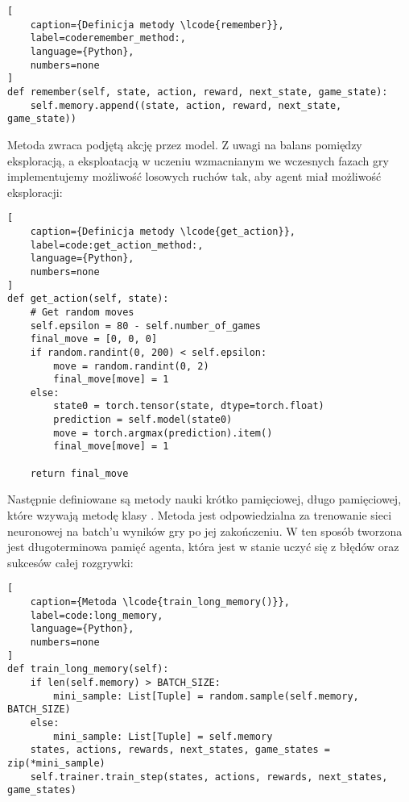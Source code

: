 \begin{onepage}
    \begin{lstlisting}[
    caption={Definicja metody \lcode{remember}},
    label=coderemember_method:,
    language={Python},
    numbers=none
]
def remember(self, state, action, reward, next_state, game_state):
    self.memory.append((state, action, reward, next_state, game_state))
    \end{lstlisting}
\end{onepage}

Metoda  zwraca podjętą akcję przez model. Z uwagi na balans pomiędzy eksploracją, a eksploatacją w uczeniu wzmacnianym we wczesnych fazach gry implementujemy możliwość losowych ruchów tak, aby agent miał możliwość eksploracji:

\begin{onepage}
    \begin{lstlisting}[
    caption={Definicja metody \lcode{get_action}},
    label=code:get_action_method:,
    language={Python},
    numbers=none
]
def get_action(self, state):
    # Get random moves
    self.epsilon = 80 - self.number_of_games
    final_move = [0, 0, 0]
    if random.randint(0, 200) < self.epsilon:
        move = random.randint(0, 2)
        final_move[move] = 1
    else:
        state0 = torch.tensor(state, dtype=torch.float)
        prediction = self.model(state0)
        move = torch.argmax(prediction).item()
        final_move[move] = 1

    return final_move
\end{lstlisting}
\end{onepage}



Następnie definiowane są metody nauki krótko pamięciowej, długo pamięciowej, które wzywają metodę  klasy .
Metoda  jest odpowiedzialna za trenowanie sieci neuronowej na batch'u wyników gry po jej zakończeniu. W ten sposób tworzona jest długoterminowa pamięć agenta, która jest w stanie uczyć się z błędów oraz sukcesów całej rozgrywki:

\begin{onepage}
    \begin{lstlisting}[
    caption={Metoda \lcode{train_long_memory()}},
    label=code:long_memory,
    language={Python},
    numbers=none
]
def train_long_memory(self):
    if len(self.memory) > BATCH_SIZE:
        mini_sample: List[Tuple] = random.sample(self.memory, BATCH_SIZE)
    else:
        mini_sample: List[Tuple] = self.memory
    states, actions, rewards, next_states, game_states = zip(*mini_sample)
    self.trainer.train_step(states, actions, rewards, next_states, game_states)

\end{lstlisting}
\end{onepage}



